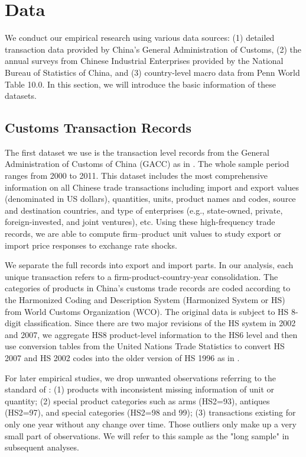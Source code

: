 \chapter{Data}\label{sec-3.data}

We conduct our empirical research using various data sources: (1) detailed transaction data provided by China’s General Administration of Customs, (2) the annual surveys from Chinese Industrial Enterprises provided by the National Bureau of Statistics of China, and (3) country-level macro data from Penn World Table 10.0. In this section, we will introduce the basic information of these datasets.

\section{Customs Transaction Records}

The first dataset we use is the transaction level records from the General Administration of Customs of China (GACC) as in \cite{manova-zhang2012}. The whole sample period ranges from 2000 to 2011. This dataset includes the most comprehensive information on all Chinese trade transactions including import and export values (denominated in US dollars), quantities, units, product names and codes, source and destination countries, and type of enterprises (e.g., state-owned, private, foreign-invested, and joint ventures), etc. Using these high-frequency trade records, we are able to compute firm–product unit values to study export or import price responses to exchange rate shocks. 

We separate the full records into export and import parts. In our analysis, each unique transaction refers to a firm-product-country-year consolidation. The categories of products in China's customs trade records are coded according to the Harmonized Coding and Description System (Harmonized System or HS) from World Customs Organization (WCO). The original data is subject to HS 8-digit classification. Since there are two major revisions of the HS system in 2002 and 2007, we aggregate HS8 product-level information to the HS6 level and then use conversion tables from the United Nations Trade Statistics to convert HS 2007 and HS 2002 codes into the older version of HS 1996 as in \cite{fan-li-yeaple2015}.

For later empirical studies, we drop unwanted observations referring to the standard of \cite{lmx2015}: (1) products with inconsistent missing information of unit or quantity; (2) special product categories such as arms (HS2=93), antiques (HS2=97), and special categories (HS2=98 and 99); (3) transactions existing for only one year without any change over time. Those outliers only make up a very small part of observations. We will refer to this sample as the "long sample" in subsequent analyses.

